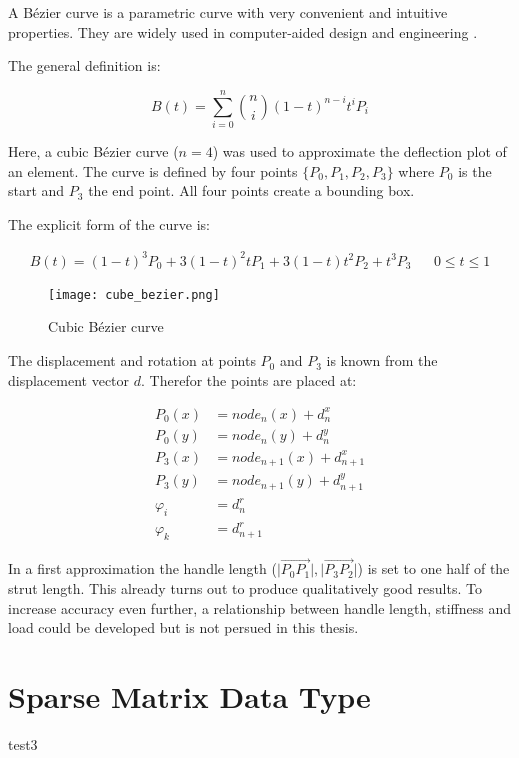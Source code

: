A B\'{e}zier curve is a parametric curve with very convenient and intuitive properties. They are widely used in computer-aided design and engineering \cite[1.3]{beziercad} \cite[3.-5.]{bezier}.

The general definition is:

\begin{equation} \label{generalBezier}
B(t) = \sum\limits_{i=0}^n \binom{n}{i} (1-t)^{n-i} t^{i} P_i
\end{equation}

Here, a cubic B\'{e}zier curve ($n=4$) was used to approximate the deflection plot of an element. The curve is defined by four points $\{P_0, P_1, P_2, P_3\}$ where $P_0$ is the start and $P_3$ the end point. All four points create a bounding box.

The explicit form of the curve is:

\begin{align*} \label{cubeBezier}
B(t) = (1-t)^3 P_0 + 3 (1-t)^2 t P_1 + 3 (1-t) t^2 P_2 + t^3 P_3 && 0 \leq t \leq 1
\end{align*}

\begin{figure}[h]%
    \centering
    \texttt{[image: cube\_bezier.png]}%
    \caption{Cubic B\'{e}zier curve}%
    \label{fig:cubeBezier}%
\end{figure}

The displacement and rotation at points $P_0$ and $P_3$ is known from the displacement vector $d$. Therefor the points are placed at:

\begin{equation*} \label{bezierHandles}
\begin{aligned}
P_0(x) &= node_n(x) + d_n^x \\
P_0(y) &= node_n(y) + d_n^y \\
P_3(x) &= node_{n+1}(x) + d_{n+1}^x \\
P_3(y) &= node_{n+1}(y) + d_{n+1}^y \\
\varphi_i &= d_n^r \\
\varphi_k &= d_{n+1}^r
\end{aligned}
\end{equation*}

In a first approximation the handle length ($\lvert\overrightarrow{P_0P_1}\lvert , \lvert\overrightarrow{P_3P_2}\lvert$) is set to one half of the strut length. This already turns out to produce qualitatively good results.
To increase accuracy even further, a relationship between handle length, stiffness and load could be developed but is not persued in this thesis. 

\section{Sparse Matrix Data Type}
\label{sec:section3.3}

test3
